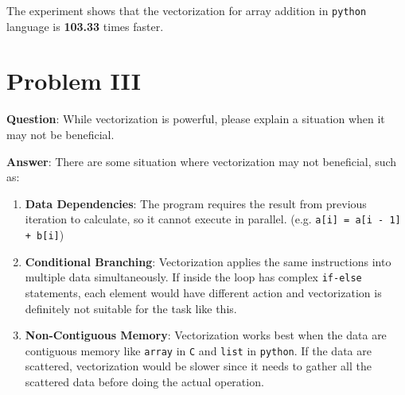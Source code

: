 \documentclass[12pt, a4paper]{article}
\begin{document}
            The experiment shows that the vectorization for array addition in \texttt{python} language is \textbf{103.33} times faster.

    \pagebreak

    \section{Problem III}

    \noindent \textbf{Question}: While vectorization is powerful, please explain a situation when it may not be beneficial.

    \vspace{1em}

    \noindent \textbf{Answer}: There are some situation where vectorization may not beneficial, such as:
    \begin{enumerate}
        \item \textbf{Data Dependencies}: The program requires the result from previous iteration to calculate, so it cannot execute in parallel. (e.g. \texttt{a[i] = a[i - 1] + b[i]})
        \item \textbf{Conditional Branching}: Vectorization applies the same instructions into multiple data simultaneously. If inside the loop has complex \texttt{if-else} statements, each element would have different action and vectorization is definitely not suitable for the task like this.
        \item \textbf{Non-Contiguous Memory}: Vectorization works best when the data are contiguous memory like \texttt{array} in \texttt{C} and \texttt{list} in \texttt{python}. If the data are scattered, vectorization would be slower since it needs to gather all the scattered data before doing the actual operation.
    \end{enumerate}
\end{document}

